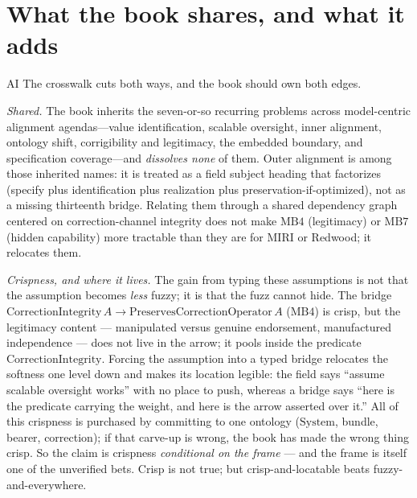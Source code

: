 \section{What the book shares, and what it adds}
\label{sec:bridge-crosswalk-takeaway}
\begin{authbar}{AI}
The crosswalk cuts both ways, and the book should own both edges.

\emph{Shared.} The book inherits the seven-or-so recurring problems across model-centric alignment agendas---value identification, scalable oversight, inner alignment, ontology shift, corrigibility and legitimacy, the embedded boundary, and specification coverage---and \emph{dissolves none} of them.
Outer alignment is among those inherited names: it is treated as a field subject heading that factorizes (specify plus identification plus realization plus preservation-if-optimized), not as a missing thirteenth bridge.
Relating them through a shared dependency graph centered on correction-channel integrity does not make \(\text{MB4}\) (legitimacy) or \(\text{MB7}\) (hidden capability) more tractable than they are for MIRI or Redwood; it relocates them.

\emph{Crispness, and where it lives.} The gain from typing these assumptions is not that the assumption becomes \emph{less} fuzzy; it is that the fuzz cannot hide.
The bridge \(\mathrm{CorrectionIntegrity}\,A \to \mathrm{PreservesCorrectionOperator}\,A\) (\(\text{MB4}\)) is crisp, but the legitimacy content --- manipulated versus genuine endorsement, manufactured independence --- does not live in the arrow; it pools inside the predicate \(\mathrm{CorrectionIntegrity}\).
Forcing the assumption into a typed bridge relocates the softness one level down and makes its location legible: the field says ``assume scalable oversight works'' with no place to push, whereas a bridge says ``here is the predicate carrying the weight, and here is the arrow asserted over it.''
All of this crispness is purchased by committing to one ontology (\(\mathrm{System}\), bundle, bearer, correction); if that carve-up is wrong, the book has made the wrong thing crisp.
So the claim is crispness \emph{conditional on the frame} --- and the frame is itself one of the unverified bets.
Crisp is not true; but crisp-and-locatable beats fuzzy-and-everywhere.


\end{authbar}
